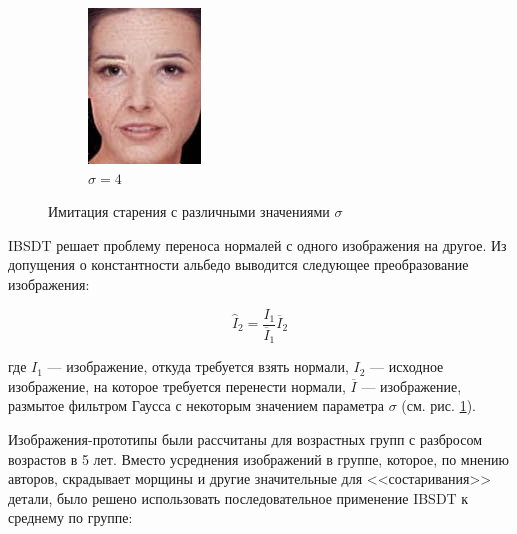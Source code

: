 \begin{figure}[t]
\begin{subfigure}[t]{0.2\textwidth}
		\includegraphics[width=\textwidth]{gandhi/sim4.png}
		\caption{$\sigma = 4$ }
	\end{subfigure}
	\caption{Имитация старения с различными значениями $\sigma$}
	\label{fig:sigmas}
\end{figure}

IBSDT решает проблему переноса нормалей с одного изображения на другое. Из допущения о константности альбедо выводится следующее преобразование изображения:

$$
\widehat{I}_2 = \frac {I_1} {\overline{I}_1} \overline{I}_2
$$

где $ I_1 $ --- изображение, откуда требуется взять нормали, $ I_2 $ --- исходное изображение, на которое требуется перенести нормали, $ \overline{I} $ --- изображение, размытое фильтром Гаусса с некоторым значением параметра $\sigma$ (см. рис. \ref{fig:sigmas}).

Изображения-прототипы были рассчитаны для возрастных групп с разбросом возрастов в 5 лет. Вместо усреднения изображений в группе, которое, по мнению авторов, скрадывает морщины и другие значительные для <<состаривания>> детали, было решено использовать последовательное применение IBSDT к среднему по группе:

